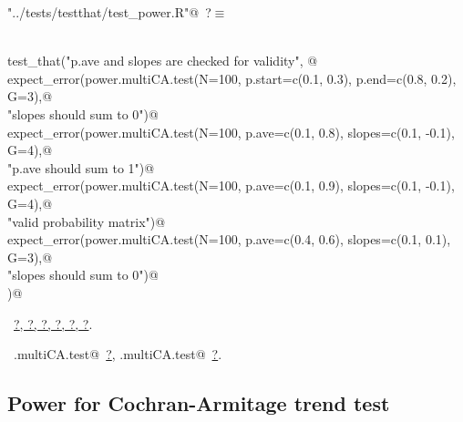 \documentclass[reqno]{amsart}
\renewcommand{\NWtarget}[2]{\hypertarget{#1}{#2}}
\renewcommand{\NWlink}[2]{\hyperlink{#1}{#2}}
\begin{document}
\begin{flushleft} \small\label{scrap22}\raggedright\small
\NWtarget{nuweb?}{} \verb@"../tests/testthat/test_power.R"@\nobreak\ {\footnotesize {?}}$\equiv$
\vspace{-1ex}
\begin{list}{}{} \item
\mbox{}\verb@@\\
\mbox{}\verb@  test_that("p.ave and slopes are checked for validity", {@\\
\mbox{}\verb@    expect_error(power.multiCA.test(N=100, p.start=c(0.1, 0.3), p.end=c(0.8, 0.2), G=3),@\\
\mbox{}\verb@                "slopes should sum to 0")@\\
\mbox{}\verb@    expect_error(power.multiCA.test(N=100, p.ave=c(0.1, 0.8), slopes=c(0.1, -0.1), G=4),@\\
\mbox{}\verb@                  "p.ave should sum to 1")@\\
\mbox{}\verb@    expect_error(power.multiCA.test(N=100, p.ave=c(0.1, 0.9), slopes=c(0.1, -0.1), G=4),@\\
\mbox{}\verb@                  "valid probability matrix")@\\
\mbox{}\verb@    expect_error(power.multiCA.test(N=100, p.ave=c(0.4, 0.6), slopes=c(0.1, 0.1), G=3),@\\
\mbox{}\verb@                "slopes should sum to 0")@\\
\mbox{}\verb@  })@\\
\mbox{}\verb@@{\NWsep}
\end{list}
\vspace{-1.5ex}
\footnotesize
\begin{list}{}{\setlength{\itemsep}{-\parsep}\setlength{\itemindent}{-\leftmargin}}
\item \NWtxtFileDefBy\ \NWlink{nuweb?}{?}\NWlink{nuweb?}{, ?}\NWlink{nuweb?}{, ?}\NWlink{nuweb?}{, ?}\NWlink{nuweb?}{, ?}\NWlink{nuweb?}{, ?}.
\item \NWtxtIdentsUsed\nobreak\  \verb@.multiCA.test@\nobreak\ \NWlink{nuweb?}{?}, \verb@power.multiCA.test@\nobreak\ \NWlink{nuweb?}{?}.
\item{}
\end{list}
\vspace{4ex}
\end{flushleft}
\subsection{Power for Cochran-Armitage trend test}
\end{document}
